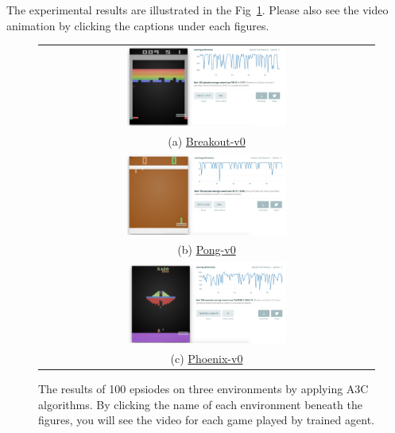 The experimental results are illustrated in the Fig~\ref{fig:A3C_baselines}. Please also
see the video animation by clicking the captions under each figures. 

\begin{figure}[h!]
\centering
\begin{tabular}{c}
\includegraphics[width=0.49\textwidth]{./fig/A3C_Breakout-v0.png} \\
(a) \href{https://gym.openai.com/evaluations/eval_i9E40nAQuOTiSa0bxYBA#reproducibility}{Breakout-v0} \\
\includegraphics[width=0.49\textwidth]{./fig/A3C_Pong-v0.png} \\
(b) \href{https://gym.openai.com/evaluations/eval_mvXuxP13SSacO01UIhsg#reproducibility}{Pong-v0} \\
\includegraphics[width=0.49\textwidth]{./fig/A3C_Phoenix-v0.png} \\
(c) \href{https://gym.openai.com/evaluations/eval_Gva8XrEvTQi63KOd5Gyq1Q#reproducibility}{Phoenix-v0} \\
\end{tabular}
\caption{The results of 100 epsiodes on three environments by applying A3C algorithms. By clicking the name of each environment 
beneath the figures, you will see the video for each game played by trained agent.}
\label{fig:A3C_baselines}
\end{figure}



